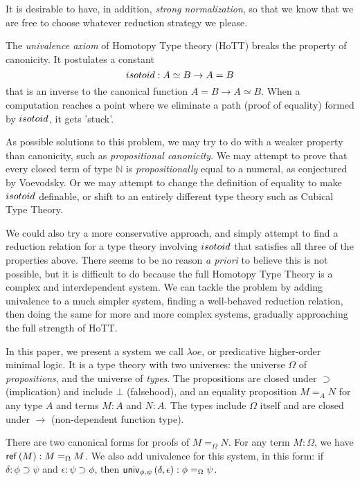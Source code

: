 It is desirable to have, in addition, \emph{strong normalization}, so that we know that we are free to choose whatever reduction strategy we please.

The \emph{univalence axiom} of Homotopy Type theory (HoTT) \cite{hottbook} breaks the property of canonicity.  It postulates a
constant
\[ isotoid : A \simeq B \rightarrow A = B \]
that is an inverse to the canonical function $A = B \rightarrow A \simeq B$.  When a computation reaches a point
where we eliminate a path (proof of equality) formed by $isotoid$, it gets 'stuck'.

As possible solutions to this problem, we may try to do with a weaker property than canonicity, such as \emph{propositional canonicity}.
We may attempt to prove that every closed term of type $\mathbb{N}$ is \emph{propositionally} equal to a numeral, as conjectured by Voevodsky.  Or we may attempt to change the definition of equality to make $isotoid$ definable\cite{Polonsky14a}, or
shift to an entirely different type theory such as Cubical Type Theory\cite{cchm:cubical}.

We could also try a more conservative approach, and simply attempt to find a reduction relation for a type theory involving $isotoid$ that satisfies
all three of the properties above.  There seems to be no reason \emph{a priori} to believe this is not possible, but it is difficult to do because
the full Homotopy Type Theory is a complex and interdependent system.  We can tackle the problem by adding univalence to a much simpler system, finding
a well-behaved reduction relation, then doing the same for more and more complex systems, gradually approaching the full strength of HoTT.

In this paper, we present a system we call $\lambda o e$, or predicative higher-order minimal logic.  It is a type theory with two universes: the universe $\Omega$
of \emph{propositions}, and the universe of \emph{types}.  The propositions are closed under $\supset$ (implication) and include $\bot$ (falsehood), and an equality proposition $M =_A N$ for
any type $A$ and terms $M : A$ and $N : A$.  The types include $\Omega$ itself and are closed under $\rightarrow$ (non-dependent function type).

There are two canonical forms for proofs of $M =_\Omega N$.  For any term $M : \Omega$, we have $\mathsf{ref} \left( {M} \right) : M =_\Omega M$.  We also add univalence for this system, in this form:
if $\delta : \phi \supset \psi$ and $\epsilon : \psi \supset\phi$, then $\mathsf{univ}_{{\phi} , {\psi}} \left( {\delta} , {\epsilon} \right) : \phi =_\Omega \psi$.  

